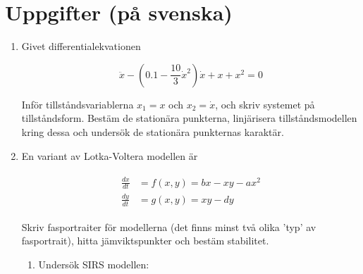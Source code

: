 \hypertarget{uppgifter-puxe5-svenska}{%
\section{Uppgifter (på svenska)}\label{uppgifter-puxe5-svenska}}

\begin{enumerate}
\item
  Givet differentialekvationen

  \[\ddot{x} - (0.1 - \frac{10}{3} \dot{x}^2 ) \dot{x} + x + x^2 = 0\]

  Inför tillståndsvariablerna \(x_1 = x\) och \(x_2 = \dot{x}\), och
  skriv systemet på tillståndsform. Bestäm de stationära punkterna,
  linjärisera tillståndsmodellen kring dessa och undersök de stationära
  punkternas karaktär.
\item
  En variant av Lotka-Voltera modellen är

  \[\begin{aligned}
  \begin{aligned}
     \frac{dx}{dt} & = f(x,y) = bx-xy - ax^2  \\
     \frac{dy}{dt} & = g(x,y) =xy-dy
  \end{aligned}
  \end{aligned}\]

  Skriv fasportraiter för modellerna (det finns minst två olika 'typ' av
  fasportrait), hitta jämviktspunkter och bestäm stabilitet.

  \begin{enumerate}
  \tightlist
  \item
    Undersök SIRS modellen:
  \end{enumerate}
\end{enumerate}

